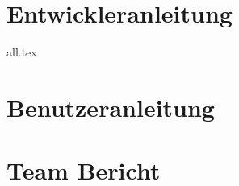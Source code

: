 













\tableofcontents




\texttt{}
\begin{lstlisting}[language=bash, keywords={}]
\end{lstlisting}
\begin{lstlisting}[language={[x86masm]Assembler}]
\end{lstlisting}

\chapter{Entwickleranleitung}
\label{dev}
{all.tex}

\chapter{Benutzeranleitung}
\label{user}

\chapter{Team Bericht}
\label{team}




